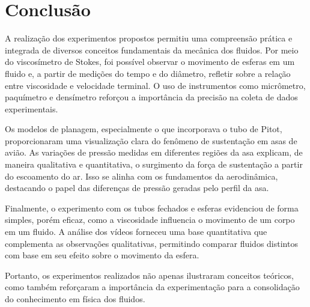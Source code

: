 \section{Conclusão}

A realização dos experimentos propostos permitiu uma compreensão prática e integrada de diversos conceitos fundamentais da mecânica dos fluidos. Por meio do viscosímetro de Stokes, foi possível observar o movimento de esferas em um fluido e, a partir de medições do tempo e do diâmetro, refletir sobre a relação entre viscosidade e velocidade terminal. O uso de instrumentos como micrômetro, paquímetro e densímetro reforçou a importância da precisão na coleta de dados experimentais.

Os modelos de planagem, especialmente o que incorporava o tubo de Pitot, proporcionaram uma visualização clara do fenômeno de sustentação em asas de avião. As variações de pressão medidas em diferentes regiões da asa explicam, de maneira qualitativa e quantitativa, o surgimento da força de sustentação a partir do escoamento do ar. Isso se alinha com os fundamentos da aerodinâmica, destacando o papel das diferenças de pressão geradas pelo perfil da asa.

Finalmente, o experimento com os tubos fechados e esferas evidenciou de forma simples, porém eficaz, como a viscosidade influencia o movimento de um corpo em um fluido. A análise dos vídeos forneceu uma base quantitativa que complementa as observações qualitativas, permitindo comparar fluidos distintos com base em seu efeito sobre o movimento da esfera.

Portanto, os experimentos realizados não apenas ilustraram conceitos teóricos, como também reforçaram a importância da experimentação para a consolidação do conhecimento em física dos fluidos.